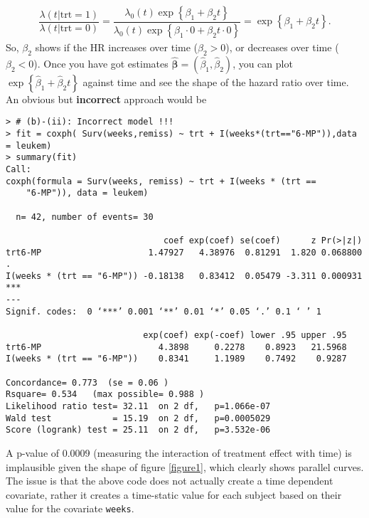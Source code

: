 \begin{enumerate}[(a)]
\begin{enumerate}[(i)]
\begin{align}
\dfrac{\lambda(t|\text{trt}=1)}{\lambda(t|\text{trt}=0)}
=\dfrac{\lambda_{0}(t)\exp\left\{\beta_{1}+\beta_{2}t\right\}}{\lambda_{0}(t)\exp\left\{\beta_{1}\cdot0+\beta_{2}t\cdot0\right\}}
=\exp\left\{\beta_{1}+\beta_{2}t\right\}.
\nonumber
\end{align}
So, $\beta_{2}$ shows if the HR increases over time ($\beta_{2}>0$), or decreases over time ($\beta_{2}<0$). Once you have got estimates $\hat{\boldsymbol{\beta}}=(\hat{\beta}_{1},\hat{\beta}_{2})$, you can plot $\exp\left\{\hat{\beta}_{1}+\hat{\beta}_{2}t\right\}$ against time and see the shape of the hazard ratio over time.
An obvious but \textbf{incorrect} approach would be
\begin{spacing}{1.2}
\begin{footnotesize}
\begin{verbatim}
> # (b)-(ii): Incorrect model !!!
> fit = coxph( Surv(weeks,remiss) ~ trt + I(weeks*(trt=="6-MP")),data = leukem)
> summary(fit)
Call:
coxph(formula = Surv(weeks, remiss) ~ trt + I(weeks * (trt == 
    "6-MP")), data = leukem)

  n= 42, number of events= 30 

                               coef exp(coef) se(coef)      z Pr(>|z|)    
trt6-MP                     1.47927   4.38976  0.81291  1.820 0.068800 .  
I(weeks * (trt == "6-MP")) -0.18138   0.83412  0.05479 -3.311 0.000931 ***
---
Signif. codes:  0 ‘***’ 0.001 ‘**’ 0.01 ‘*’ 0.05 ‘.’ 0.1 ‘ ’ 1

                           exp(coef) exp(-coef) lower .95 upper .95
trt6-MP                       4.3898     0.2278    0.8923   21.5968
I(weeks * (trt == "6-MP"))    0.8341     1.1989    0.7492    0.9287

Concordance= 0.773  (se = 0.06 )
Rsquare= 0.534   (max possible= 0.988 )
Likelihood ratio test= 32.11  on 2 df,   p=1.066e-07
Wald test            = 15.19  on 2 df,   p=0.0005029
Score (logrank) test = 25.11  on 2 df,   p=3.532e-06
\end{verbatim}
\end{footnotesize}
\end{spacing}
A p-value of 0.0009 (measuring the interaction of treatment effect with time) is implausible given the shape of figure \eqref{figure1}, which clearly shows parallel curves. The issue is that the above code does not actually create a
time dependent covariate, rather it creates a time-static value for each subject based on their
value for the covariate \verb|weeks|.


\end{enumerate}
\end{enumerate}

